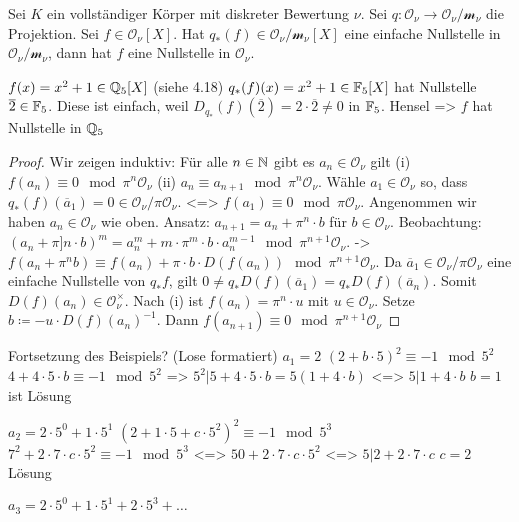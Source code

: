 \documentclass[../main.tex]{subfiles}
\begin{document}
\begin{lemma}
    Sei $K$ ein vollständiger Körper mit diskreter Bewertung $\nu$. Sei $q: \mathcal{O}_\nu\rightarrow \mathcal{O}_\nu/\mathcal{m}_\nu$ die Projektion.
    Sei $f\in \mathcal{O}_\nu[X]$. Hat $q_*(f)\in \mathcal{O}_\nu/\mathcal{m}_\nu [X]$ eine einfache Nullstelle in $\mathcal{O}_\nu/\mathcal{m}_\nu$, dann hat $f$ eine Nullstelle in $\mathcal{O}_\nu$.
\end{lemma}
\begin{example*}
    $f(x)= x^2+1\in\mathbb{Q}_5[X]$ (siehe 4.18)
    $q_*(f)(x) = x^2+1\in \mathbb{F}_5[X]$ hat Nullstelle $\overline{2}\in \mathbb{F}_5$. Diese ist einfach, weil $D_{q_*}(f)(\overline{2}) = 2\cdot \overline{2}\neq 0$ in $\mathbb{F}_5$.
    Hensel => $f$ hat Nullstelle in $\mathbb{Q}_5$
\end{example*}
\begin{proof}
    Wir zeigen induktiv:
    Für alle $n\in \mathbb{N}$ gibt es $a_n\in \mathcal{O}_\nu$ gilt
    (i) $f(a_n) \equiv 0 \mod \pi^n\mathcal{O}_\nu$
    (ii) $a_n\equiv a_{n+1} \mod \pi^n\mathcal{O}_\nu$.
    Wähle $a_1\in \mathcal{O}_\nu$ so, dass $q_*(f)(\overline{a}_1) = 0\in \mathcal{O}_\nu/\pi \mathcal{O}_\nu$. <=> $f(a_1) \equiv 0\mod \pi \mathcal{O}_\nu$.
    Angenommen wir haben $a_n\in \mathcal{O}_\nu$ wie oben.
    Ansatz: $a_{n+1} = a_n + \pi^n \cdot b$ für $b\in \mathcal{O}_\nu$.
    Beobachtung: $(a_n+\pi]n\cdot b)^m = a_n^m + m\cdot \pi^m\cdot b\cdot a_n^{m-1} \mod \pi^{n+1}\mathcal{O}_\nu$.
    -> $f(a_n+\pi^nb) \equiv f(a_n) + \pi\cdot b\cdot D(f(a_n)) \mod \pi^{n+1} \mathcal{O}_\nu$.
    Da $\overline{a}_1 \in \mathcal{O}_\nu/ \pi \mathcal{O}_\nu$ eine einfache Nullstelle von $q_* f$, gilt $0\neq q_* D(f)(\overline{a}_1) = q_* D(f)(\overline{a}_n)$. Somit $D(f)(a_n)\in \mathcal{O}_\nu^\times$.
    Nach (i) ist $f(a_n) = \pi^n\cdot u$ mit $u\in \mathcal{O}_\nu$. Setze $b\coloneqq -u\cdot D(f)(a_n)^{-1}$.
    Dann $f(a_{n+1}) \equiv 0 \mod \pi^{n+1}\mathcal{O}_\nu$
\end{proof}

Fortsetzung des Beispiels? (Lose formatiert)
$a_1=2$ 
$(2+b\cdot 5)^2\equiv -1 \mod 5^2$
$4+4\cdot 5\cdot b \equiv -1 \mod 5^2$
=> $5^2| 5+4\cdot 5\cdot b = 5(1+4\cdot b)$
<=> $5| 1+4\cdot b$
$b=1$ ist Lösung

$a_2 = 2 \cdot 5^0+1\cdot 5^1$
$(2+1\cdot 5 + c\cdot 5^2)^2\equiv-1 \mod 5^3$
$7^2+2\cdot 7\cdot c \cdot 5^2\equiv -1\mod 5^3$
<=> $50+2\cdot 7 \cdot c \cdot 5^2$
<=>
$5| 2+2\cdot 7\cdot c$
$c = 2$ Lösung


$a_3 = 2\cdot 5^0+ 1\cdot 5^1 + 2\cdot 5^3+\dots$
\end{document}
